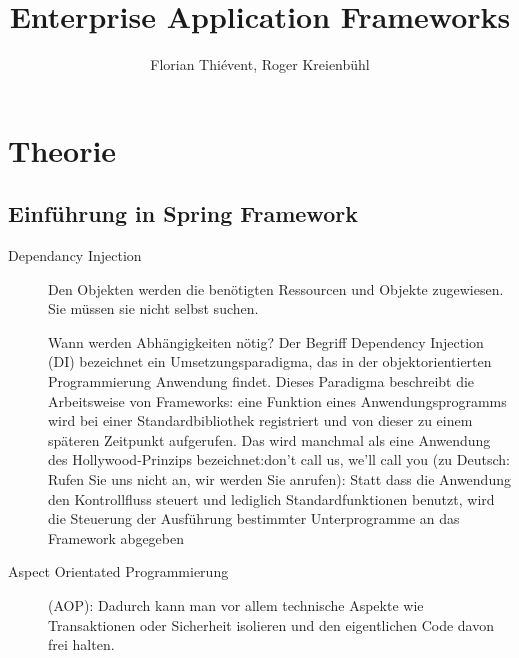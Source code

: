 \documentclass[a4paper,10pt]{scrreprt}
\title{Enterprise Application Frameworks}
\author{Florian Thiévent, Roger Kreienbühl}
\begin{document}
\maketitle
\tableofcontents
\newpage
 \pagestyle{fancy}
\part{Theorie}
\chapter{Einführung in Spring Framework}
\begin{description}
 \item [Dependancy Injection] Den Objekten werden die benötigten Ressourcen und Objekte
zugewiesen. Sie müssen sie nicht selbst suchen.
 
 Wann werden Abhängigkeiten nötig? Der Begriff Dependency Injection (DI) bezeichnet ein Umsetzungsparadigma, das in der objektorientierten Programmierung Anwendung findet.
Dieses Paradigma beschreibt die Arbeitsweise von Frameworks: eine Funktion eines
Anwendungsprogramms wird bei einer Standardbibliothek registriert und von dieser zu einem
späteren Zeitpunkt aufgerufen. Das wird manchmal als eine Anwendung des Hollywood-Prinzips
bezeichnet:don't call us, we'll call you (zu Deutsch: Rufen Sie uns nicht an, wir werden Sie
anrufen): Statt dass die Anwendung den Kontrollfluss steuert und lediglich Standardfunktionen
benutzt, wird die Steuerung der Ausführung bestimmter Unterprogramme an das Framework
abgegeben
\item [Aspect Orientated Programmierung] (AOP): Dadurch kann man vor allem technische Aspekte
wie Transaktionen oder Sicherheit isolieren und den eigentlichen Code davon frei halten.
 


\end{description}
\end{document}
